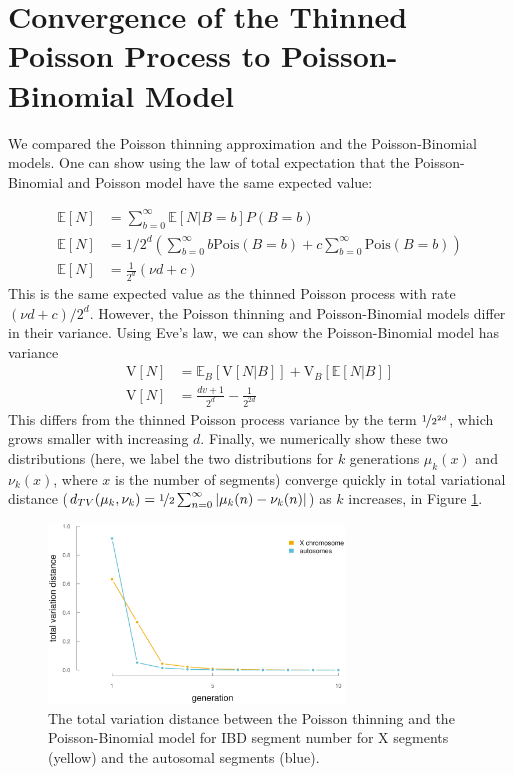 \documentclass[11pt]{article}
\newcommand{\E}{\mathbb{E}}
\newcommand{\V}{\text{V}}
\begin{document}
\newpage
\appendix

\section{Convergence of the Thinned Poisson Process to Poisson-Binomial Model}
\label{ap:pois-thin}

We compared the Poisson thinning approximation and the Poisson-Binomial models.
One can show using the law of total expectation that the Poisson-Binomial and
Poisson model have the same expected value:

\begin{align}
  \E[N] &= \sum_{b=0}^\infty \E[N | B = b]P(B = b)\\
  \E[N] &= 1/2^d \left( \sum_{b=0}^\infty b \text{Pois}(B = b) + c \sum_{b=0}^\infty \text{Pois}(B = b) \right) \\
  \E[N] &= \frac{1}{2^d} (\nu d + c)
\end{align}
%
This is the same expected value as the thinned Poisson process with rate $(\nu
d + c)/2^d$. However, the Poisson thinning and Poisson-Binomial models differ
in their variance. Using Eve's law, we can show the Poisson-Binomial model has
variance
%
\begin{align}
  \label{eq:n-variance}
  \V[N] &= \E_B[\V[N | B]] + \V_B[\E[N|B]]\\
  \V[N] &= \frac{dv + 1}{2^d} - \frac{1}{2^{2d}}
\end{align}
%
This differs from the thinned Poisson process variance by the term
$\nicefrac{1}{2^{2d}}$, which grows smaller with increasing $d$. Finally, we
numerically show these two distributions (here, we label the two distributions
for $k$ generations $\mu_k(x)$ and $\nu_k(x)$, where $x$ is the number of
segments) converge quickly in total variational distance ($d_{TV}(\mu_k, \nu_k) =
\nicefrac{1}{2}\sum_{n = 0}^\infty | \mu_k(n) - \nu_k(n) |$) as $k$ increases,
in Figure \ref{fig:total-var-dist}.

\begin{figure}[!ht]
  \centering
  \includegraphics[width=0.7\textwidth]{images/total-var-dist}

  \caption{The total variation distance between the Poisson thinning and the
  Poisson-Binomial model for IBD segment number for X segments (yellow) and the
autosomal segments (blue).}

\label{fig:total-var-dist}
\end{figure}
\end{document}
